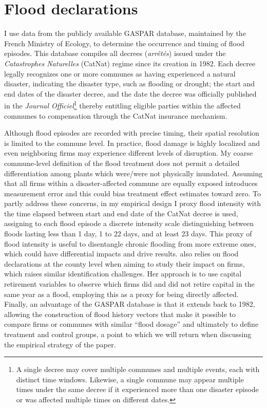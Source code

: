 \section{Flood declarations}
\label{sec: data_1}
I use data from the publicly available GASPAR database, maintained by the French Ministry of Ecology, to determine the occurrence and timing of flood episodes. This database compiles all decrees (\textit{arrêtés}) issued under the \textit{Catastrophes Naturelles} (CatNat) regime since its creation in 1982. Each decree legally recognizes one or more communes as having experienced a natural disaster, indicating the disaster type, such as flooding  or drought; the start and end dates of the disaster decree, and the date the decree was officially published in the \textit{Journal Officiel}\footnote{A single decree may cover multiple communes and multiple events, each with distinct time windows. Likewise, a single commune may appear multiple times under the same decree if it experienced more than one disaster episode or was affected multiple times on different dates.} thereby entitling eligible parties within the affected communes to compensation through the CatNat insurance mechanism.

Although flood episodes are recorded with precise timing, their spatial resolution is limited to the commune level. In practice, flood damage is highly localized and even neighboring firms may experience different levels of disruption. My coarse commune-level definition of the flood treatment does not permit
a detailed differentiation among plants which were/were not physically inundated. Assuming that all firms within a disaster-affected commune are equally exposed introduces measurement error and this could bias treatment effect estimates toward zero. To partly address these concerns, in my empirical design I proxy flood intensity with the time elapsed between start and end date of the CatNat decree is used, assigning to each flood episode a discrete intensity scale distinguishing between floods lasting less than 1 day, 1 to 22 days, and at least 23 days. This proxy of flood intensity is useful to disentangle chronic flooding from more extreme ones, which could have differential impacts and drive results. \citet{erda2024disasters} also relies on flood declarations at the county level when aiming to study their impact on firms, which raises similar identification challenges. Her approach is to use capital retirement variables to observe which firms did and did not retire capital in the same year as a flood, employing this as a proxy for being directly affected. Finally, an advantage of the GASPAR database is that it extends back to 1982, allowing the construction of flood history vectors that make it possible to compare firms or communes with similar “flood dosage” and ultimately to define treatment and control groups, a point to which we will return when discussing the empirical strategy of the paper.


